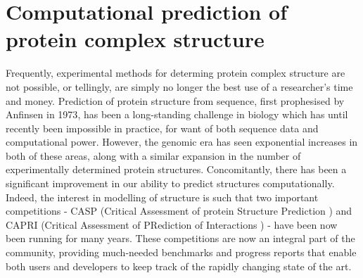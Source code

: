 \documentclass[a4paper,11pt,twoside,openright]{scrbook}
\begin{document}
\section{Computational prediction of protein complex structure}
Frequently, experimental methods for determing protein complex structure are not possible, or tellingly, are simply no longer the best use of a researcher's time and money. Prediction of protein structure from sequence, first prophesised by Anfinsen in 1973\cite{Anfinsen1973}, has been a long-standing challenge in biology which has until recently been impossible in practice, for want of both sequence data and computational power. However, the genomic era has seen exponential increases in both of these areas, along with a similar expansion in the number of experimentally determined protein structures. Concomitantly, there has been a significant improvement in our ability to predict structures computationally. Indeed, the interest in modelling of structure is such that two important competitions - CASP (Critical Assessment of protein Structure Prediction \cite{Moult1995}) and CAPRI (Critical Assessment of PRediction of Interactions \cite{Janin2003}) - have been now been running for many years. These competitions are now an integral part of the community, providing much-needed benchmarks and progress reports that enable both users and developers to keep track of the rapidly changing state of the art.
\end{document}
